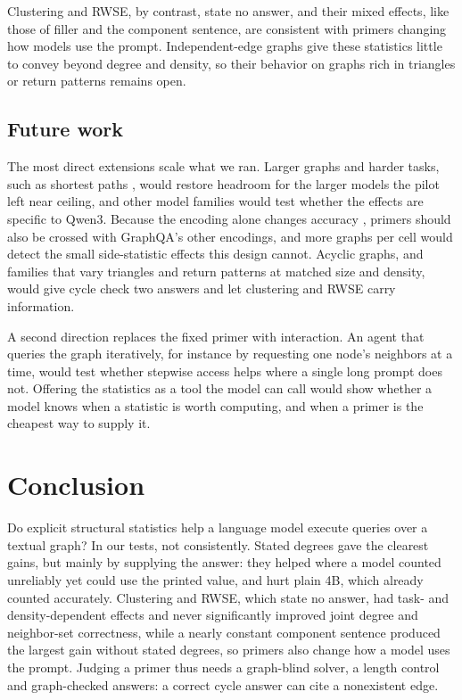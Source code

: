 \documentclass[11pt]{article}
\begin{document}
Clustering and RWSE, by contrast, state no answer, and their mixed effects, like those of filler and the component sentence, are consistent with primers changing how models use the prompt. Independent-edge graphs give these statistics little to convey beyond degree and density, so their behavior on graphs rich in triangles or return patterns remains open.

\subsection{Future work}
\label{sec:future}
The most direct extensions scale what we ran. Larger graphs and harder tasks, such as shortest paths \citep{wang2023nlgraph}, would restore headroom for the larger models the pilot left near ceiling, and other model families would test whether the effects are specific to Qwen3. Because the encoding alone changes accuracy \citep{fatemi2023talklikeagraph}, primers should also be crossed with GraphQA's other encodings, and more graphs per cell would detect the small side-statistic effects this design cannot. Acyclic graphs, and families that vary triangles and return patterns at matched size and density, would give cycle check two answers and let clustering and RWSE carry information.

A second direction replaces the fixed primer with interaction. An agent that queries the graph iteratively, for instance by requesting one node's neighbors at a time, would test whether stepwise access helps where a single long prompt does not. Offering the statistics as a tool the model can call would show whether a model knows when a statistic is worth computing, and when a primer is the cheapest way to supply it.

\section{Conclusion}
\label{sec:conclusion}
Do explicit structural statistics help a language model execute queries over a textual graph? In our tests, not consistently. Stated degrees gave the clearest gains, but mainly by supplying the answer: they helped where a model counted unreliably yet could use the printed value, and hurt plain 4B, which already counted accurately. Clustering and RWSE, which state no answer, had task- and density-dependent effects and never significantly improved joint degree and neighbor-set correctness, while a nearly constant component sentence produced the largest gain without stated degrees, so primers also change how a model uses the prompt. Judging a primer thus needs a graph-blind solver, a length control and graph-checked answers: a correct cycle answer can cite a nonexistent edge.
\end{document}
